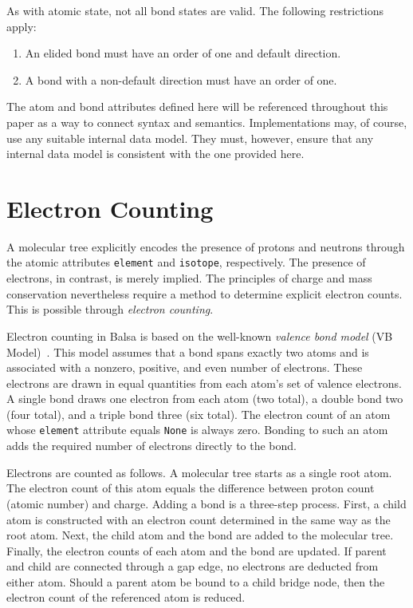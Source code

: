 \documentclass{article}
\def\ttt{\texttt}
\begin{document}
As with atomic state, not all bond states are valid. The following restrictions apply:

\begin{enumerate}
    \item{An elided bond must have an order of one and default direction.}
    \item{A bond with a non-default direction must have an order of one.}
\end{enumerate}

The atom and bond attributes defined here will be referenced throughout this paper as a way to connect syntax and semantics. Implementations may, of course, use any suitable internal data model. They must, however, ensure that any internal data model is consistent with the one provided here.

\section*{Electron Counting}
\label{electron-counting}

A molecular tree explicitly encodes the presence of protons and neutrons through the atomic attributes \ttt{element} and \ttt{isotope}, respectively. The presence of electrons, in contrast, is merely implied. The principles of charge and mass conservation nevertheless require a method to determine explicit electron counts. This is possible through \textit{electron counting}. 

Electron counting in Balsa is based on the well-known \textit{valence bond model} (VB Model)~\cite{lewis:1916}. This model assumes that a bond spans exactly two atoms and is associated with a nonzero, positive, and even number of electrons. These electrons are drawn in equal quantities from each atom's set of valence electrons. A single bond draws one electron from each atom (two total), a double bond two (four total), and a triple bond three (six total). The electron count of an atom whose \ttt{element} attribute equals \ttt{None} is always zero. Bonding to such an atom adds the required number of electrons directly to the bond.

Electrons are counted as follows. A molecular tree starts as a single root atom. The electron count of this atom equals the difference between proton count (atomic number) and charge. Adding a bond is a three-step process. First, a child atom is constructed with an electron count determined in the same way as the root atom. Next, the child atom and the bond are added to the molecular tree. Finally, the electron counts of each atom and the bond are updated. If parent and child are connected through a gap edge, no electrons are deducted from either atom. Should a parent atom be bound to a child bridge node, then the electron count of the referenced atom is reduced.
\end{document}
